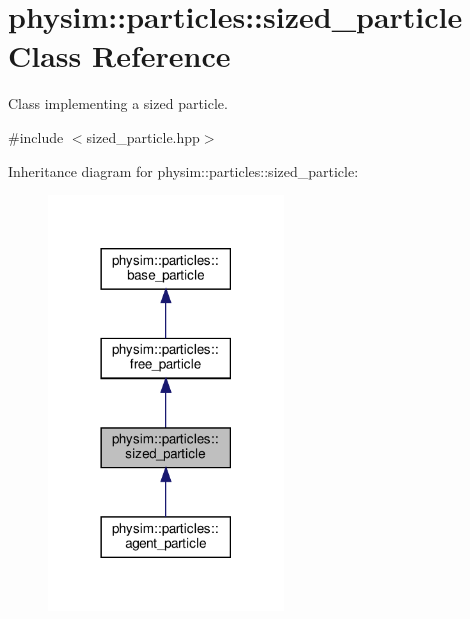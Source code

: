 \hypertarget{classphysim_1_1particles_1_1sized__particle}{}\section{physim\+:\+:particles\+:\+:sized\+\_\+particle Class Reference}
\label{classphysim_1_1particles_1_1sized__particle}


Class implementing a sized particle.  




{\ttfamily \#include $<$sized\+\_\+particle.\+hpp$>$}



Inheritance diagram for physim\+:\+:particles\+:\+:sized\+\_\+particle\+:\nopagebreak
\begin{figure}[H]
\begin{center}
\leavevmode
\includegraphics[width=177pt]{classphysim_1_1particles_1_1sized__particle__inherit__graph}
\end{center}
\end{figure}


